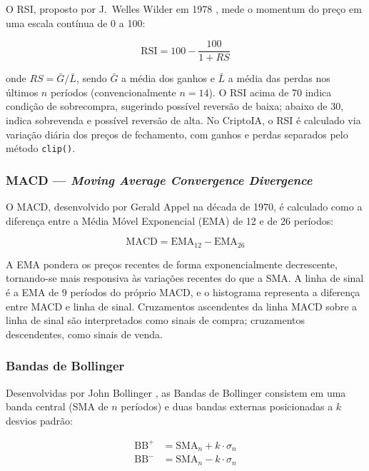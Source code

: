 \documentclass[conference]{IEEEtran}
\begin{document}
O RSI, proposto por J.~Welles Wilder em 1978 \cite{wilder1978new}, mede o momentum do preço em uma escala contínua de 0 a 100:

\begin{equation}
  \text{RSI} = 100 - \frac{100}{1 + RS}
  \label{eq:rsi}
\end{equation}

\noindent onde $RS = \bar{G}/\bar{L}$, sendo $\bar{G}$ a média dos ganhos e $\bar{L}$ a média das perdas nos últimos $n$ períodos (convencionalmente $n=14$). O RSI acima de 70 indica condição de sobrecompra, sugerindo possível reversão de baixa; abaixo de 30, indica sobrevenda e possível reversão de alta. No CriptoIA, o RSI é calculado via variação diária dos preços de fechamento, com ganhos e perdas separados pelo método \texttt{clip()}.

\subsubsection{MACD — \textit{Moving Average Convergence Divergence}}

O MACD, desenvolvido por Gerald Appel na década de 1970, é calculado como a diferença entre a Média Móvel Exponencial (EMA) de 12 e de 26 períodos:

\begin{equation}
  \text{MACD} = \text{EMA}_{12} - \text{EMA}_{26}
  \label{eq:macd}
\end{equation}

\noindent A EMA pondera os preços recentes de forma exponencialmente decrescente, tornando-se mais responsiva às variações recentes do que a SMA. A linha de sinal é a EMA de 9 períodos do próprio MACD, e o histograma representa a diferença entre MACD e linha de sinal. Cruzamentos ascendentes da linha MACD sobre a linha de sinal são interpretados como sinais de compra; cruzamentos descendentes, como sinais de venda.

\subsubsection{Bandas de Bollinger}

Desenvolvidas por John Bollinger \cite{bollinger2001bollinger}, as Bandas de Bollinger consistem em uma banda central (SMA de $n$ períodos) e duas bandas externas posicionadas a $k$ desvios padrão:

\begin{align}
  \text{BB}^{+} &= \text{SMA}_n + k \cdot \sigma_n \label{eq:bb_sup} \\
  \text{BB}^{-} &= \text{SMA}_n - k \cdot \sigma_n \label{eq:bb_inf}
\end{align}
\end{document}
